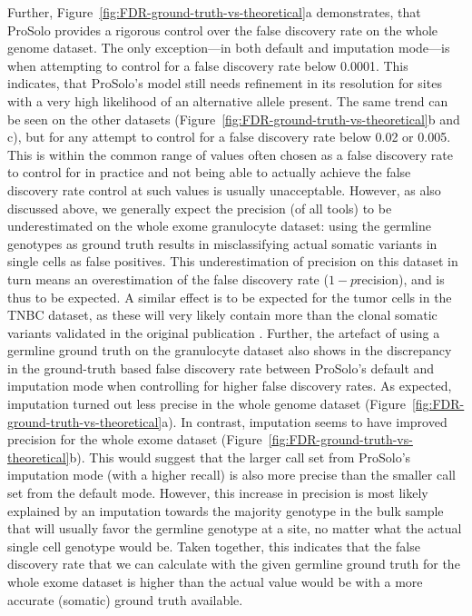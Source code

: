 \documentclass[authoryear,preprint,11pt]{scrartcl}
\begin{document}
Further, Figure~\ref{fig:FDR-ground-truth-vs-theoretical}a demonstrates, that ProSolo provides a rigorous control over the false discovery rate on the whole genome dataset.
The only exception---in both default and imputation mode---is when attempting to control for a false discovery rate below 0.0001.
This indicates, that ProSolo's model still needs refinement in its resolution for sites with a very high likelihood of an alternative allele present.
The same trend can be seen on the other datasets (Figure~\ref{fig:FDR-ground-truth-vs-theoretical}b and c), but for any attempt to control for a false discovery rate below 0.02 or 0.005.
This is within the common range of values often chosen as a false discovery rate to control for in practice and not being able to actually achieve the false discovery rate control at such values is usually unacceptable.
However, as also discussed above, we generally expect the precision (of all tools) to be underestimated on the whole exome granulocyte dataset: using the germline genotypes as ground truth results in misclassifying actual somatic variants in single cells as false positives.
This underestimation of precision on this dataset in turn means an overestimation of the false discovery rate ($1 - p$recision), and is thus to be expected.
A similar effect is to be expected for the tumor cells in the TNBC dataset, as these will very likely contain more than the clonal somatic variants validated in the original publication \citep{wang_clonal_2014}.
Further, the artefact of using a germline ground truth on the granulocyte dataset also shows in the discrepancy in the ground-truth based false discovery rate between ProSolo's default and imputation mode when controlling for higher false discovery rates.
As expected, imputation turned out less precise in the whole genome dataset (Figure~\ref{fig:FDR-ground-truth-vs-theoretical}a).
In contrast, imputation seems to have improved precision for the whole exome dataset (Figure~\ref{fig:FDR-ground-truth-vs-theoretical}b).
This would suggest that the larger call set from ProSolo's imputation mode (with a higher recall) is also more precise than the smaller call set from the default mode.
However, this increase in precision is most likely explained by an imputation towards the majority genotype in the bulk sample that will usually favor the germline genotype at a site, no matter what the actual single cell genotype would be.
Taken together, this indicates that the false discovery rate that we can calculate with the given germline ground truth for the whole exome dataset is higher than the actual value would be with a more accurate (somatic) ground truth available.
\end{document}
